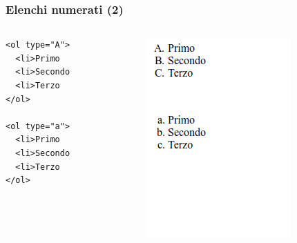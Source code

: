 \documentclass[]{beamer}
\begin{document}
\begin{frame}[fragile]
\frametitle{Elenchi numerati (2)}

\begin{columns}
\begin{column}{0.45\textwidth}
\begin{scriptsize}
\begin{verbatim}
<ol type="A">
  <li>Primo
  <li>Secondo
  <li>Terzo
</ol>

<ol type="a">
  <li>Primo
  <li>Secondo
  <li>Terzo
</ol>
\end{verbatim}
\end{scriptsize}
\end{column}
\begin{column}{0.45\textwidth}
\begin{figure}
\includegraphics[width=0.5\columnwidth]{screenshots/elenconumerato2.png}
\end{figure}
\end{column}
\end{columns}
\end{frame}
\end{document}
